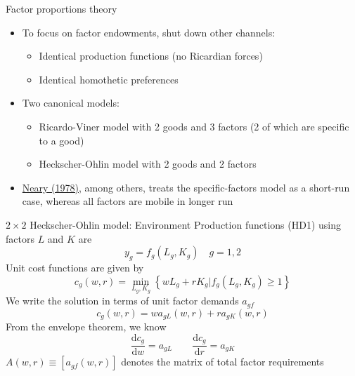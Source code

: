 \documentclass[11pt,notes=hide,aspectratio=169]{beamer}
\begin{document}
\begin{frame}{Factor proportions theory}
\begin{itemize}
	\item To focus on factor endowments, shut down other channels:
	\begin{itemize}
		\item Identical production functions (no Ricardian forces)
		\item Identical homothetic preferences
	\end{itemize}
	\item Two canonical models:
	\begin{itemize}
		\item Ricardo-Viner model with 2 goods and 3 factors (2 of which are specific to a good)
		\item Heckscher-Ohlin model with 2 goods and 2 factors
	\end{itemize}
	\item \href{https://www.jstor.org/stable/pdf/2232049.pdf}{Neary (1978)}, among others, treats the specific-factors model as a short-run case, whereas all factors are mobile in longer run
\end{itemize}
\end{frame}
\begin{frame}{$2 \times 2$ Heckscher-Ohlin model: Environment}
Production functions (HD1) using factors $L$ and $K$ are
\begin{equation*}
y_{g}=f_{g}\left( L_{g},K_{g}\right) \quad g=1,2
\end{equation*}
Unit cost functions are given by
\begin{equation*}
c_{g}\left( w,r\right) =\min_{L_{g},K_{g}}\left\{ wL_{g}+rK_{g}|f_{g}\left(
L_{g},K_{g}\right) \geq 1\right\}
\end{equation*}
We write the solution in terms of unit factor demands $a_{gf}$
\begin{equation*}
c_{g}\left( w,r\right) =wa_{gL}\left( w,r\right) +ra_{gK}\left( w,r\right)
\end{equation*}
From the envelope theorem, we know
\begin{equation*}
\frac{\textrm{d} c_{g}}{\textrm{d} w}=a_{gL} \qquad \frac{\textrm{d} c_{g}}{\textrm{d} r}=a_{gK}
\end{equation*}
$A(w,r)\equiv [a_{gf}(w,r)]$ denotes the matrix of total factor requirements
\end{frame}
\end{document}
